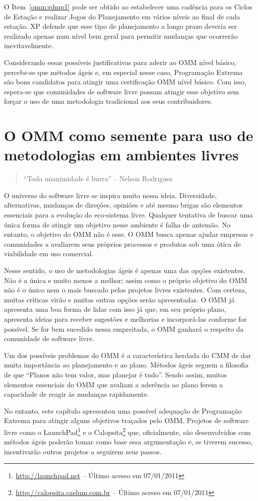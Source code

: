 O Item~\ref{omm:rdmp1} pode ser obtido ao estabelecer uma cadência
para os Ciclos de Estação e realizar Jogos do Planejamento em vários
níveis ao final de cada estação. XP defende que esse tipo de
planejamento a longo prazo deveria ser realizado apenas num nível bem
geral para permitir mudanças que ocorrerão inevitavelmente.

Considerando essas possíveis justificativas para aderir ao OMM nível
básico, percebe-se que métodos ágeis e, em especial nesse caso,
Programação Extrema são bons candidatos para atingir uma certificação
OMM nível básico. Com isso, espera-se que comunidades de software
livre possam atingir esse objetivo sem forçar o uso de uma metodologia
tradicional aos seus contribuidores.

\section[OMM no contexto livre]{O OMM como semente para uso de
  metodologias em ambientes livres}
\label{sec:sl+omm}

\begin{quote}
  ``Toda unanimidade é burra'' -- Nelson Rodrigues
\end{quote}

O universo do software livre se inspira muito nessa
ideia. Diversidade, alternativas, mudanças de direções, opiniões e até
mesmo brigas são elementos essenciais para a evolução do eco-sistema
livre. Qualquer tentativa de buscar uma única forma de atingir um
objetivo nesse ambiente é falha de antemão. No entanto, o objetivo do
OMM não é esse. O OMM busca apenas ajudar empresas e comunidades a
avaliarem seus próprios processos e produtos sob uma ótica de
viabilidade em uso comercial.

Nesse sentido, o uso de metodologias ágeis é apenas uma das opções
existentes.  Não é a única e muito menos a melhor; assim como o
próprio objetivo do OMM não é o único nem o mais buscado pelos
projetos livres existentes. Com certeza, muitas críticas virão e
muitas outras opções serão apresentadas. O OMM já apresenta uma boa
forma de lidar com isso já que, em seu próprio plano, apresenta ideias
para receber sugestões e melhorias e incorporá-las conforme for
possível.  Se for bem sucedido nessa empreitada, o OMM ganhará o
respeito da comunidade de software livre.

Um dos possíveis problemas do OMM é a característica herdada do CMM de
dar muita importância ao planejamento e ao plano. Métodos ágeis seguem
a filosofia de que ``Planos não tem valor, mas planejar é
tudo''. Sendo assim, muitos elementos essenciais do OMM que avaliam a
aderência ao plano ferem a capacidade de reagir às mudanças
rapidamente.

No entanto, este capítulo apresentou uma possível adequação de
Programação Extrema para atingir alguns objetivos traçados pelo
OMM. Projetos de software livre como o
LaunchPad\footnote{\url{http://launchpad.net} -- Último acesso em
  07/01/2011} e o
Calopsita\footnote{\url{http://calopsita.caelum.com.br} -- Último
  acesso em 07/01/2011} que, oficialmente, são desenvolvidos com
métodos ágeis poderão tomar como base essa argumentação e, se tiverem
sucesso, incentivarão outros projetos a seguirem seus passos.
